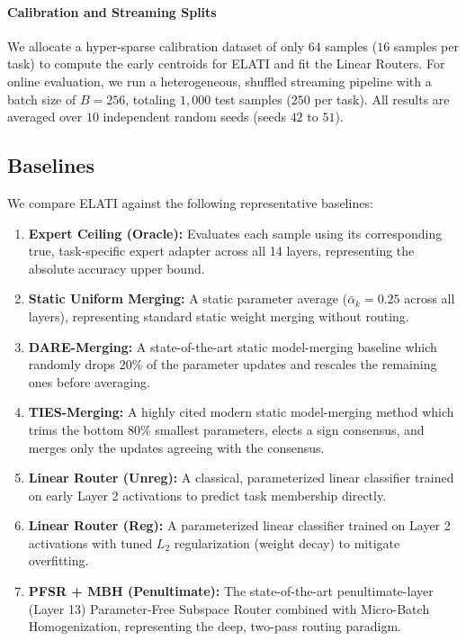 \paragraph{Calibration and Streaming Splits}
We allocate a hyper-sparse calibration dataset of only $64$ samples ($16$ samples per task) to compute the early centroids for ELATI and fit the Linear Routers.
For online evaluation, we run a heterogeneous, shuffled streaming pipeline with a batch size of $B = 256$, totaling $1,000$ test samples ($250$ per task).
All results are averaged over $10$ independent random seeds (seeds $42$ to $51$).

\subsection{Baselines}
We compare ELATI against the following representative baselines:
\begin{enumerate}
    \item \textbf{Expert Ceiling (Oracle):} Evaluates each sample using its corresponding true, task-specific expert adapter across all 14 layers, representing the absolute accuracy upper bound.
    \item \textbf{Static Uniform Merging:} A static parameter average ($\bar{\alpha}_k = 0.25$ across all layers), representing standard static weight merging without routing.
    \item \textbf{DARE-Merging:} A state-of-the-art static model-merging baseline which randomly drops $20\%$ of the parameter updates and rescales the remaining ones before averaging.
    \item \textbf{TIES-Merging:} A highly cited modern static model-merging method which trims the bottom $80\%$ smallest parameters, elects a sign consensus, and merges only the updates agreeing with the consensus.
    \item \textbf{Linear Router (Unreg):} A classical, parameterized linear classifier trained on early Layer 2 activations to predict task membership directly.
    \item \textbf{Linear Router (Reg):} A parameterized linear classifier trained on Layer 2 activations with tuned $L_2$ regularization (weight decay) to mitigate overfitting.
    \item \textbf{PFSR + MBH (Penultimate):} The state-of-the-art penultimate-layer (Layer 13) Parameter-Free Subspace Router combined with Micro-Batch Homogenization, representing the deep, two-pass routing paradigm.
\end{enumerate}

